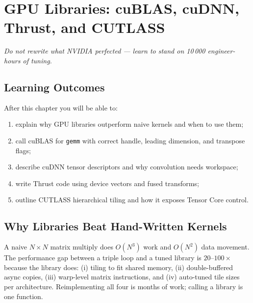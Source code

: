 \chapter{GPU Libraries: cuBLAS, cuDNN, Thrust, and CUTLASS}\label{ch:libraries}
\sloppy

\begin{center}\small\textit{Do not rewrite what NVIDIA perfected --- learn to stand on 10\,000 engineer-hours of tuning.}\end{center}

\noindent{}
\vspace{0.4em}

\section*{Learning Outcomes}
After this chapter you will be able to:
\begin{enumerate}[label=(L\arabic*)]
    \item explain why GPU libraries outperform naive kernels and when to use them;
    \item call cuBLAS for \texttt{gemm} with correct handle, leading dimension, and transpose flags;
    \item describe cuDNN tensor descriptors and why convolution needs workspace;
    \item write Thrust code using device vectors and fused transforms;
    \item outline CUTLASS hierarchical tiling and how it exposes Tensor Core control.
\end{enumerate}

\section{Why Libraries Beat Hand-Written Kernels}
A naive $N\!\times\!N$ matrix multiply does $O(N^{3})$ work and $O(N^{2})$ data movement. The performance gap between a triple loop and a tuned library is $20$--$100\times$ because the library does: (i) tiling to fit shared memory, (ii) double-buffered async copies, (iii) warp-level matrix instructions, and (iv) auto-tuned tile sizes per architecture. Reimplementing all four is months of work; calling a library is one function.

